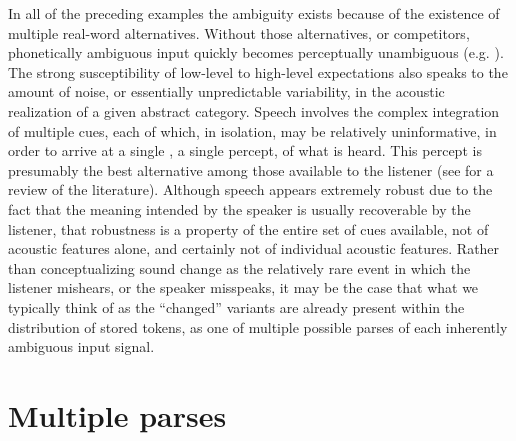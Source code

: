 In all of the preceding examples the ambiguity exists because of the
existence of multiple real-word alternatives. Without those alternatives,
or competitors, phonetically ambiguous input quickly becomes perceptually
unambiguous (e.g. \citealp{warren1970perceptual,ganong1980phonetic}).
The strong susceptibility of low-level  to high-level expectations
also speaks to the amount of noise, or essentially unpredictable variability,
in the acoustic realization of a given abstract category. Speech 
involves the complex integration of multiple cues, each of which,
in isolation, may be relatively uninformative, in order to arrive
at a single , a single percept, of what is heard. This percept
is presumably the best alternative among those available to the listener
(see \citet{davis2007hearing} for a review of the literature). Although
speech  appears extremely robust due to the fact that the
meaning intended by the speaker is usually recoverable by the listener,
that robustness is a property of the entire set of cues available,
not of acoustic features alone, and certainly not of individual acoustic
features. Rather than conceptualizing sound change as the relatively
rare event in which the listener mishears, or the speaker misspeaks,
it may be the case that what we typically think of as the “changed”
variants are already present within the distribution of stored tokens,
as one of multiple possible parses of each inherently ambiguous input
signal.

\section{Multiple parses}

